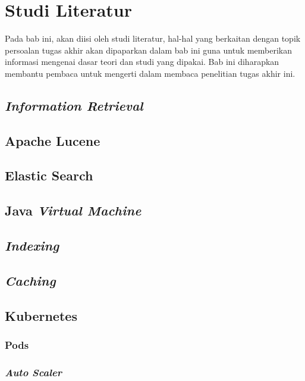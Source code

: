 \chapter{Studi Literatur}

Pada bab ini, akan diisi oleh studi literatur, hal-hal yang berkaitan dengan topik persoalan tugas akhir akan dipaparkan dalam bab ini guna untuk memberikan informasi mengenai dasar teori dan studi yang dipakai. Bab ini diharapkan membantu pembaca untuk mengerti dalam membaca penelitian tugas akhir ini.

\section{\textit{Information Retrieval}}

\section{Apache Lucene}

\section{Elastic Search}

\section{Java \textit{Virtual Machine}}

\section{\textit{Indexing}}

\section{\textit{Caching}}

\section{Kubernetes}

\subsection{Pods}

\subsection{\textit{Auto Scaler}}

